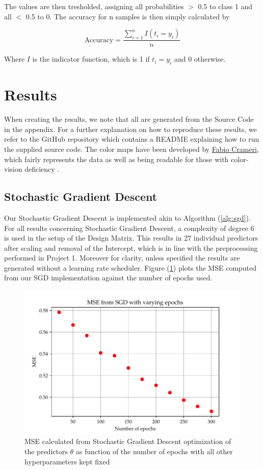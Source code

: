 \documentclass
[twocolumn,
secnumarabic,
nobibnotes,
aps,
prl,
reprint,
groupedaddress,
amsmath,
amssymb
]{revtex4-2}
\begin{document}
The values are then tresholded, assigning all probabilities $>$ 0.5 to class 1 and all $<$ 0.5 to 0. The accuracy for n samples is then simply calculated by

\begin{equation}
  \text{Accuracy} = \frac{\sum_{i=1}^n I(t_i = y_i)}{n}
\end{equation}

Where $I$ is the indicator function, which is 1 if $t_i = y_i$ and 0 otherwise.

\section{Results}
When creating the results, we note that all are generated from the Source Code in the appendix. For a further explanation on how to reproduce these results, we refer to the GitHub repository which contains a README explaining how to run the supplied source code. The color maps have been developed by \href{https://www.fabiocrameri.ch/colourmaps/}{Fabio Crameri}, which fairly represents the data as well as being readable for those with color-vision deficiency \cite{Crameri2021}.

\subsection{Stochastic Gradient Descent}
Our Stochastic Gradient Descent is implemented akin to Algorithm (\ref{alg:sgd}). For all results concerning Stochastic Gradient Descent, a complexity of degree 6 is used in the setup of the Design Matrix. This results in 27 individual predictors after scaling and removal of the Intercept, which is in line with the preprocessing performed in Project 1. Moreover for clarity, unless specified the results are generated without a learning rate scheduler.
Figure (\ref{fig:a_mse_epoch}) plots the MSE computed from our SGD implementation against the number of epochs used.

\begin{figure}
  \includegraphics[width=\columnwidth]{figures/EX_A_mse_with_varying_epoch.pdf}
  \caption{\label{fig:a_mse_epoch}MSE calculated from Stochastic Gradient Descent optimization of the predictors $\theta$ as function of the number of epochs with all other hyperparameters kept fixed}
\end{figure}
\end{document}

